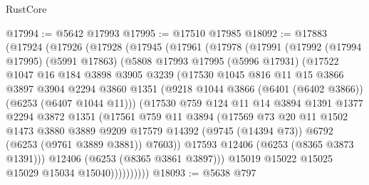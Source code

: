 \begin{lexlean}{RustCore}
\begin{coremodule}
@17994 := @5642 @17993
@17995 := @17510 @17985
@18092 := @17883
    (@17924
      (@17926
        (@17928
          (@17945
            (@17961
              (@17978
                (@17991
                  (@17992
                    (@17994 @17995)
                    (@5991 @17863)
                    (@5808
                      @17993
                      @17995
                      (@5996 @17931)
                      (@17522
                        @1047
                        @16
                        @184
                        @3898
                        @3905
                        @3239
                        (@17530
                          @1045
                          @816
                          @11
                          @15
                          @3866
                          @3897
                          @3904
                          @2294
                          @3860
                          @1351
                          (@9218 @1044 @3866 (@6401 (@6402 @3866)) (@6253 (@6407 @1044 @11)))
                          (@17530
                            @759
                            @124
                            @11
                            @14
                            @3894
                            @1391
                            @1377
                            @2294
                            @3872
                            @1351
                            (@17561
                              @759
                              @11
                              @3894
                              (@17569
                                @73
                                @20
                                @11
                                @1502
                                @1473
                                @3880
                                @3889
                                @9209
                                @17579
                                @14392
                                (@9745 (@14394 @73))
                                @6792
                                (@6253 (@9761 @3889 @3881))
                                @7603))
                            @17593
                            @12406
                            (@6253 (@8365 @3873 @1391)))
                          @12406
                          (@6253 (@8365 @3861 @3897)))
                        @15019
                        @15022
                        @15025
                        @15029
                        @15034
                        @15040))))))))))
@18093 := @5638 @797

\end{coremodule}
\end{lexlean}
